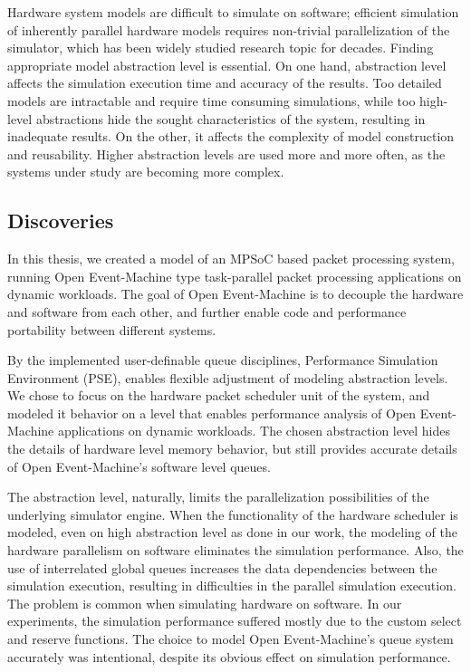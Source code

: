 Hardware system models are difficult to simulate on software; efficient simulation of inherently parallel hardware models requires non-trivial parallelization of the simulator, which has been widely studied research topic for decades. Finding appropriate model abstraction level is essential. On one hand, abstraction level affects the simulation execution time and accuracy of the results. Too detailed models are intractable and require time consuming simulations, while too high-level abstractions hide the sought characteristics of the system, resulting in inadequate results. On the other, it affects the complexity of model
construction and reusability. Higher abstraction levels are used more and more often, as the systems under study are becoming more complex.

\subsection{Discoveries}
In this thesis, we created a model of an MPSoC based packet processing system, running Open Event-Machine type task-parallel packet processing applications on dynamic workloads. The goal of Open Event-Machine is to decouple the hardware and software from each other, and further enable code and performance portability between different systems.

By the implemented user-definable queue disciplines, Performance Simulation Environment (PSE), enables flexible adjustment of modeling abstraction levels. We chose to focus on the hardware packet scheduler unit of the system, and modeled it behavior on a level that enables performance analysis of Open Event-Machine applications on dynamic workloads. The chosen abstraction level hides the details of hardware level memory behavior, but still provides accurate details of Open Event-Machine's software level queues.

The abstraction level, naturally, limits the parallelization possibilities of the underlying simulator engine. When the functionality of the hardware scheduler is modeled, even on high abstraction level as done in our work, the modeling of the hardware parallelism on software eliminates the simulation performance. Also, the use of interrelated global queues increases the data dependencies between the simulation execution, resulting in difficulties in the parallel simulation execution. The problem is common when simulating hardware on software. In our experiments, the simulation performance suffered mostly due to the custom select and reserve functions. The choice to model Open Event-Machine's queue system accurately was intentional, despite its obvious effect on simulation performance.

